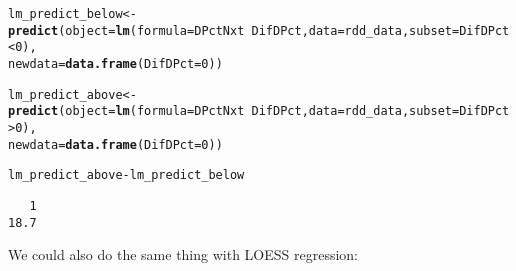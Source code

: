 \documentclass[11pt,leqno]{article}\usepackage[]{graphicx}\usepackage[]{color}
\makeatletter
\newcommand{\hlnum}[1]{\textcolor[rgb]{0.686,0.059,0.569}{#1}}%
\newcommand{\hlopt}[1]{\textcolor[rgb]{0,0,0}{#1}}%
\newcommand{\hlstd}[1]{\textcolor[rgb]{0.345,0.345,0.345}{#1}}%
\newcommand{\hlkwb}[1]{\textcolor[rgb]{0.69,0.353,0.396}{#1}}%
\newcommand{\hlkwc}[1]{\textcolor[rgb]{0.333,0.667,0.333}{#1}}%
\newcommand{\hlkwd}[1]{\textcolor[rgb]{0.737,0.353,0.396}{\textbf{#1}}}%
\newenvironment{kframe}{%
 \def\at@end@of@kframe{}%
 \ifinner\ifhmode%
  \def\at@end@of@kframe{\end{minipage}}%
  \begin{minipage}{\columnwidth}%
 \fi\fi%
 \def\FrameCommand##1{\hskip\@totalleftmargin \hskip-\fboxsep
 \colorbox{shadecolor}{##1}\hskip-\fboxsep
     \hskip-\linewidth \hskip-\@totalleftmargin \hskip\columnwidth}%
 \MakeFramed {\advance\hsize-\width
   \@totalleftmargin\z@ \linewidth\hsize
   \@setminipage}}%
 {\par\unskip\endMakeFramed%
 \at@end@of@kframe}
\newenvironment{knitrout}{}{} %
\theoremstyle{newstyle}
\makeatother
\begin{document}
\begin{knitrout}\footnotesize
{}\color{fgcolor}\begin{kframe}
\begin{alltt}
\hlstd{lm_predict_below} \hlkwb{<-} \hlkwd{predict}\hlstd{(}\hlkwc{object} \hlstd{=} \hlkwd{lm}\hlstd{(}\hlkwc{formula} \hlstd{= DPctNxt} \hlopt{~} \hlstd{DifDPct,} \hlkwc{data} \hlstd{= rdd_data,} \hlkwc{subset} \hlstd{= DifDPct} \hlopt{<} \hlnum{0}\hlstd{),}
                           \hlkwc{newdata} \hlstd{=} \hlkwd{data.frame}\hlstd{(}\hlkwc{DifDPct} \hlstd{=} \hlnum{0}\hlstd{))}

\hlstd{lm_predict_above} \hlkwb{<-} \hlkwd{predict}\hlstd{(}\hlkwc{object} \hlstd{=} \hlkwd{lm}\hlstd{(}\hlkwc{formula} \hlstd{= DPctNxt} \hlopt{~} \hlstd{DifDPct,} \hlkwc{data} \hlstd{= rdd_data,} \hlkwc{subset} \hlstd{= DifDPct} \hlopt{>} \hlnum{0}\hlstd{),}
                                 \hlkwc{newdata} \hlstd{=} \hlkwd{data.frame}\hlstd{(}\hlkwc{DifDPct} \hlstd{=} \hlnum{0}\hlstd{))}

\hlstd{lm_predict_above} \hlopt{-} \hlstd{lm_predict_below}
\end{alltt}
\begin{verbatim}
   1 
18.7 
\end{verbatim}
\end{kframe}
\end{knitrout}

\newpage
We could also do the same thing with LOESS regression:
\end{document}
